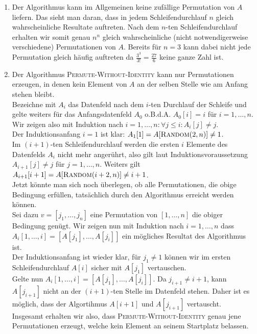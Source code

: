 \begin{solution}

\phantom{}

\begin{enumerate}[label = \alph*)]
  \item Der Algorithmus kann im Allgemeinen keine zufällige Permutation von $A$ liefern.
  Das sieht man daran, dass in jedem Schleifendurchlauf $n$ gleich wahrscheinliche
  Resultate auftreten. Nach dem $n$-ten Schleifendurchlauf erhalten wir somit
  genau $n^n$ gleich wahrscheinliche (nicht notwendigerweise verschiedene) Permutationen von $A$. Bereits für $n = 3$
  kann dabei nicht jede Permutation gleich häufig auftreten da $\frac{3^3}{3!} = \frac{27}{6}$
  keine ganze Zahl ist.
  \item Der Algorithmus \textsc{Permute-Without-Identity} kann nur Permutationen
  erzeugen, in denen kein Element von $A$ an der selben Stelle wie am Anfang stehen bleibt. \\
  Bezeichne mit $A_i$ das Datenfeld nach dem $i$-ten Durchlauf der Schleife und
  gelte weiters für das Anfangsdatenfeld $A_0$ o.B.d.A. $A_0[i] = i$ für $i = 1,\dots,n$. \\
  Wir zeigen also mit Induktion nach $i = 1,\dots,n: \forall j \leq i: A_i[j] \neq j$. \\
  Der Induktionsanfang $i = 1$ ist klar: $A_1[1] = A[\textsc{Random}(2,n)] \neq 1$. \\
  Im $(i+1)$-ten Schleifendurchlauf werden die ersten $i$ Elemente des Datenfelds $A_i$
  nicht mehr angerührt, also gilt laut Induktionsvoraussetzung $A_{i+1}[j] \neq j$
  für $j = 1,\dots,n$. Weiters gilt $A_{i+1}[i+1] = A[\textsc{Random}(i+2,n)] \neq i +1$. \\
  Jetzt könnte man sich noch überlegen, ob alle Permutationen, die obige
  Bedingung erfüllen, tatsächlich durch den Algorithmus erreicht werden können. \\
  Sei dazu $v = [j_1,\dots,j_n]$ eine Permutation von $[1,\dots,n]$ die obiger
  Bedingung genügt. Wir zeigen nun mit Induktion nach $i = 1,\dots,n$ dass
  $A_i[1,\dots,i] = [A[j_1],\dots,A[j_i]]$ ein mögliches Resultat des Algorithmus ist. \\
  Der Induktionsanfang ist wieder klar, für $j_1 \neq 1$ können wir im ersten Schleifendurchlauf
  $A[i]$ sicher mit $A[j_1]$ vertauschen. \\
  Gelte nun $A_i[1,\dots,i] = [A[j_1],\dots,A[j_i]]$. Da $j_{i+1} \neq i + 1$, kann
  $A[j_{i+1}]$ nicht an der $(i+1)$-ten Stelle im Datenfeld stehen. Daher ist es
  möglich, dass der Algortihmus $A[i+1]$ und $A[j_{i+1}]$ vertauscht. \\
  Insgesamt erhalten wir also, dass \textsc{Permute-Without-Identity}
  genau jene Permutationen erzeugt, welche kein Element an seinem Startplatz belassen.
\end{enumerate}

\end{solution}
